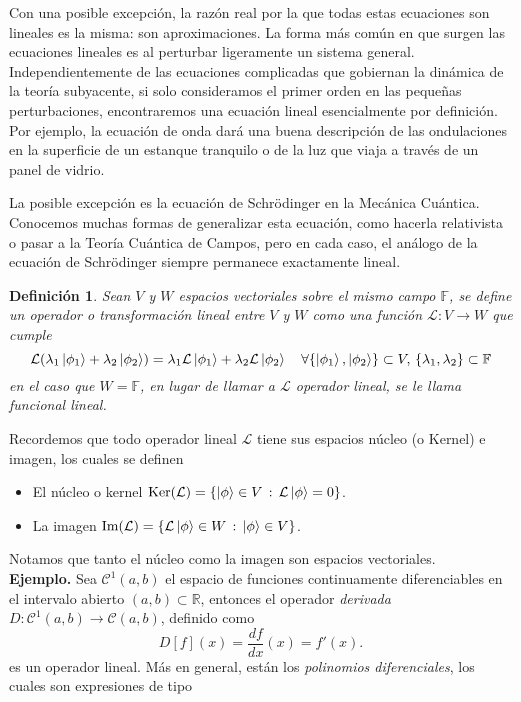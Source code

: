 \documentclass[letterpaper]{book}
\newtheorem{def.}{Definici\'on}[section]
\newcommand{\eje}{{\noindent \sc \textbf{Ejemplo. }}}
\newcommand{\re}{\ensuremath{\mathbb R }}
\begin{document}
Con una posible excepción, la razón real por la que todas estas ecuaciones son lineales es la misma: son aproximaciones. La forma más común en que surgen las ecuaciones lineales es al perturbar ligeramente un sistema general. Independientemente de las ecuaciones complicadas que gobiernan la dinámica de la teoría subyacente, si solo consideramos el primer orden en las pequeñas perturbaciones, encontraremos una ecuación lineal esencialmente por definición. Por ejemplo, la ecuación de onda dará una buena descripción de las ondulaciones en la superficie de un estanque tranquilo o de la luz que viaja a través de un panel de vidrio.

La posible excepción es la ecuación de Schrödinger en la Mecánica Cuántica. Conocemos muchas formas de generalizar esta ecuación, como hacerla relativista o pasar a la Teoría Cuántica de Campos, pero en cada caso, el análogo de la ecuación de Schrödinger siempre permanece exactamente lineal.
\begin{def.}
  Sean \(V\) y \(W\) espacios vectoriales sobre el mismo campo \(\mathbb{F}\), se define un operador o transformación lineal entre \(V\) y \(W\) como una función \(\mathcal{L}:V\rightarrow W\) que cumple
  \[
    \mathcal{L}(\lambda_1\ket{\phi_1}+\lambda_2\ket{\phi_2})= \lambda_1\mathcal{L}\ket{\phi_1}+\lambda_2\mathcal{L}\ket{\phi_2}\quad\forall\{\ket{\phi_1},\ket{\phi_2}\}\subset V,\,\{\lambda_1,\lambda_2\}\subset\mathbb{F}
  \]
\noindent en el caso que \(W=\mathbb{F}\), en lugar de llamar a \(\mathcal{L}\) operador lineal, se le llama \emph{funcional lineal}.
\end{def.}
Recordemos que todo operador lineal \(\mathcal{L}\) tiene sus espacios núcleo (o Kernel) e imagen, los cuales se definen
\begin{itemize}
  \item El núcleo o kernel \(\textrm{Ker}(\mathcal{L})=\{\ket{\phi}\in V \,:\,\mathcal{L}\ket{\phi}=0\}\).
  \item La imagen \(\textrm{Im}(\mathcal{L})=\{\mathcal{L}\ket{\phi}\in W\,:\,\ket{\phi}\in V\}\).
  \end{itemize}
Notamos que tanto el núcleo como la imagen son espacios vectoriales.\\
\eje Sea \(\mathcal{C}^1(a,b)\) el espacio de funciones continuamente diferenciables en el intervalo abierto \((a,b)\subset\re\), entonces el operador \emph{derivada} \(D:\mathcal{C}^1(a,b)\rightarrow\mathcal{C}(a,b)\), definido como
\[
D[f](x)=\dfrac{df}{dx}(x)=f'(x).
\]
\noindent es un operador lineal. Más en general, están los \emph{polinomios diferenciales}, los cuales son expresiones de tipo
\end{document}
